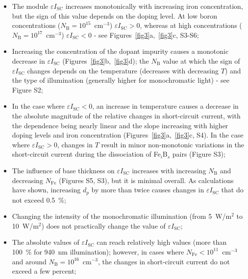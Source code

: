 \documentclass[a4paper,fleqn]{cas-sc}
\begin{document}
\begin{itemize}
    \item The module $\varepsilon I_\mathrm{SC}$ increases monotonically with increasing iron concentration, but the sign of this value depends on the doping level. At low boron concentrations ($N_\mathrm{B}=10^{15}$~cm$^{-3}$) $\varepsilon I_\mathrm{SC} > 0$, whereas at high concentrations ($N_\mathrm{B}=10^{17}$~cm$^{-3}$) $\varepsilon I_\mathrm{SC} < 0$ - see Figures~\ref{fig3}a,~\ref{fig3}c, S3-S6;
    \item Increasing the concentration of the dopant impurity causes a monotonic decrease in $\varepsilon I_\mathrm{SC}$ (Figures~\ref{fig3}b,~\ref{fig3}d); the $N_\mathrm{B}$ value at which the sign of $\varepsilon I_\mathrm{SC}$ changes depends on the temperature (decreases with decreasing $T$) and the type of illumination (generally higher for monochromatic light) - see Figure S2;
    \item In the case where $\varepsilon I_\mathrm{SC} < 0$, an increase in temperature causes a decrease in the absolute magnitude of the relative changes in short-circuit current, with the dependence being nearly linear and the slope increasing with higher doping levels and iron concentration (Figures~\ref{fig3}a,~\ref{fig3}c, S4). In the case where $\varepsilon I_\mathrm{SC} > 0$, changes in $T$ result in minor non-monotonic variations in the short-circuit current during the dissociation of Fe$_i$B$_s$ pairs (Figure S3);
    \item The influence of base thickness on $\varepsilon I_\mathrm{SC}$ increases with increasing $N_\mathrm{B}$ and decreasing $N_\mathrm{Fe}$ (Figures S5, S3), but it is minimal overall. As calculations have shown, increasing $d_p$ by more than twice causes changes in $\varepsilon I_\mathrm{SC}$ that do not exceed 0.5~\%;
    \item Changing the intensity of the monochromatic illumination (from 5~W/m$^{2}$ to 10~W/m$^{2}$) does not practically change the value of $\varepsilon I_\mathrm{SC}$;
    \item The absolute values of $\varepsilon I_\mathrm{SC}$ can reach relatively high values (more than 100~\% for 940~nm illumination); however, in cases where $N_\mathrm{Fe}<10^{11}$~cm$^{-3}$ and around $N_\mathrm{B}=10^{16}$~cm$^{-3}$, the changes in short-circuit current do not exceed a few percent;
\end{itemize}
\end{document}
